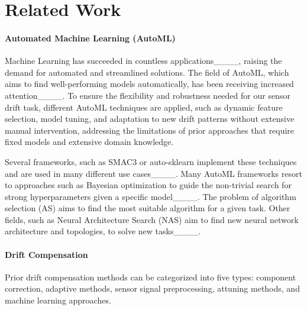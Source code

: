 \section{Related Work}
\label{sec:related}
\paragraph{Automated Machine Learning (AutoML)}
Machine Learning has succeeded in countless applications____, raising the demand for automated and streamlined solutions. The field of AutoML, which aims to find well-performing models automatically, has been receiving increased attention____. To ensure the flexibility and robustness needed for our sensor drift task, different AutoML techniques are applied, such as dynamic feature selection, model tuning, and adaptation to new drift patterns without extensive manual intervention, addressing the limitations of prior approaches that require fixed models and extensive domain knowledge.

Several frameworks, such as SMAC3 or auto-sklearn implement these techniques and are used in many different use cases____. Many AutoML frameworks resort to approaches such as Bayesian optimization to guide the non-trivial search for strong hyperparameters given a specific model____. The problem of algorithm selection (AS) aims to find the most suitable algorithm for a given task. Other fields, such as Neural Architecture Search (NAS) aim to find new neural network architecture and topologies, to solve new tasks____. 


\paragraph{Drift Compensation}\label{sec:drift_compensation}
Prior drift compensation methods can be categorized into five types: component correction, adaptive methods, sensor signal preprocessing, attuning methods, and machine learning approaches.

